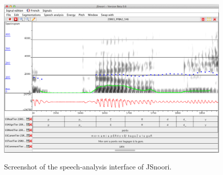 	
	\begin{figure}
		\centering
		\caption[Screenshot of the speech-analysis interface of JSnoori]{Screenshot of the speech-analysis interface of JSnoori.
		}
		\includegraphics[width=\textwidth]{img/screenshots/JsnooriScreenshot}
		\label{fig:jsnoori:screenshot}
	\end{figure}
	
